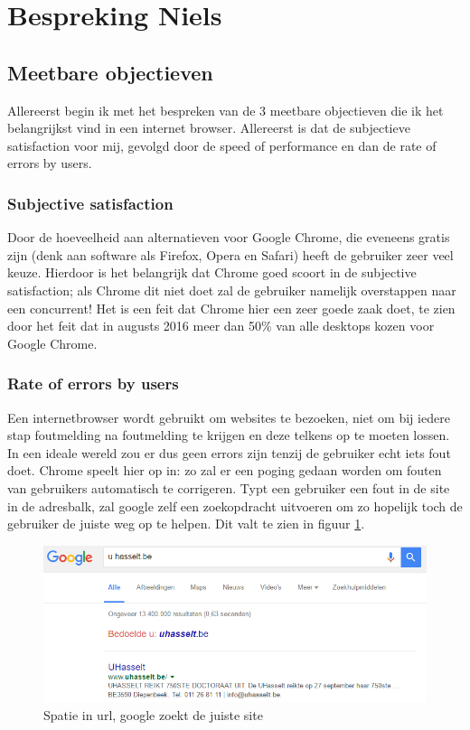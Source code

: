 \documentclass[12pt]{article}
\begin{document}
\section{Bespreking Niels}
\subsection{Meetbare objectieven}
Allereerst begin ik met het bespreken van de 3 meetbare objectieven die ik het belangrijkst vind in een internet browser. Allereerst is dat de subjectieve satisfaction voor mij, gevolgd door de speed of performance en dan de rate of errors by users.
\subsubsection{Subjective satisfaction}
Door de hoeveelheid aan alternatieven voor Google Chrome, die eveneens gratis zijn (denk aan software als Firefox, Opera en Safari) heeft de gebruiker zeer veel keuze. Hierdoor is het belangrijk dat Chrome goed scoort in de subjective satisfaction; als Chrome dit niet doet zal de gebruiker namelijk overstappen naar een concurrent! Het is een feit dat Chrome hier een zeer goede zaak doet, te zien door het feit dat in augusts 2016 meer dan 50\% van alle desktops kozen voor Google Chrome.\cite{NetShare}
\subsubsection{Rate of errors by users}
Een internetbrowser wordt gebruikt om websites te bezoeken, niet om bij iedere stap foutmelding na foutmelding te krijgen en deze telkens op te moeten lossen. In een ideale wereld zou er dus geen errors zijn tenzij de gebruiker echt iets fout doet. Chrome speelt hier op in: zo zal er een poging gedaan worden om fouten van gebruikers automatisch te corrigeren. Typt een gebruiker een fout in de site in de adresbalk, zal google zelf een zoekopdracht uitvoeren om zo hopelijk toch de gebruiker de juiste weg op te helpen. Dit valt te zien in figuur \ref{fig:search}.
\begin{figure}
	\centering
	\includegraphics[width=1\textwidth]{search.png}
	\caption{Spatie in url, google zoekt de juiste site}
	\label{fig:search}
\end{figure}
\newpage
\end{document}

